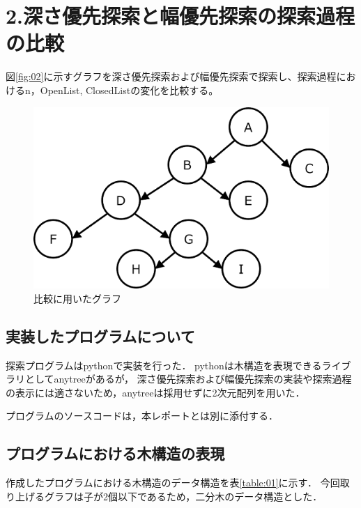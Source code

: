 \documentclass[12pt,dvipdfmx]{jarticle}
\begin{document}

\vspace{-1cm}
\section*{2.深さ優先探索と幅優先探索の探索過程の比較}
図\ref{fig:02}に示すグラフを深さ優先探索および幅優先探索で探索し、探索過程におけるn，OpenList, ClosedListの変化を比較する。
\begin{figure}[h]
	\centering
	\includegraphics{fig03.png}
	\caption{比較に用いたグラフ}
	\label{fig:03}
\end{figure}

\vspace{-1cm}
\subsection*{実装したプログラムについて}
探索プログラムはpythonで実装を行った．
pythonは木構造を表現できるライブラリとしてanytree\cite{Anytree}があるが，
深さ優先探索および幅優先探索の実装や探索過程の表示には適さないため，anytreeは採用せずに2次元配列を用いた．

プログラムのソースコードは，本レポートとは別に添付する．

\subsection*{プログラムにおける木構造の表現}
作成したプログラムにおける木構造のデータ構造を表\ref{table:01}に示す．
今回取り上げるグラフは子が2個以下であるため，二分木のデータ構造とした．
\end{document}
